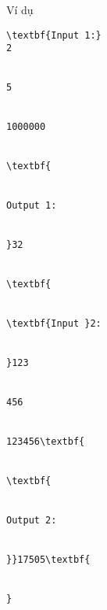 Ví dụ
\begin{verbatim}
\textbf{Input 1:}
2


5


1000000


\textbf{


Output 1:


}32


\textbf{


\textbf{Input }2:


}123


456


123456\textbf{


\textbf{


Output 2:


}}17505\textbf{


}\end{verbatim}